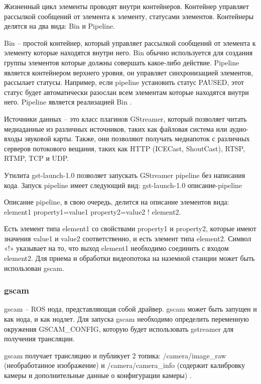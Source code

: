 Жизненный цикл элементы проводят внутри контейнеров. Контейнер управляет рассылкой сообщений от элемента к элементу, статусами элементов. Контейнеры делятся на два вида: Bin и Pipeline.

Bin -- простой контейнер, который управляет рассылкой сообщений от элемента к элементу которые находятся внутри него. Bin обычно используется для создания группы элементов которые должны совершать какое-либо действие. 
Pipeline является контейнером верхнего уровня, он управляет синхронизацией элементов, рассылает статусы. Например, если pipeline установить статус PAUSED, этот статус будет автоматически разослан всем элементам которые находятся внутри него. Pipeline является реализацией Bin \cite{gstreamer}. 

Источники данных -- это класс плагинов GStreamer, который позволяет читать медиаданные из различных источников, таких как файловая система или аудио-входы звуковой карты. Также, они позволяют получать медиапоток с различных серверов потокового вещания, таких как HTTP (ICECast, ShoutCast), RTSP, RTMP, TCP и UDP. 

Утилита gst-launch-1.0 позволяет запускать GStreamer pipeline без написания кода. Запуск pipeline имеет следующий вид:
gst-launch-1.0 описание-pipeline

Описание pipeline, в свою очередь, делится на описание элементов вида:
element1 property1=value1 property2=value2 ! element2.

Есть элемент типа element1 со свойствами property1 и property2, которые имеют значения value1 и value2 соответственно, и есть элемент типа element2. Символ «!» указывает на то, что выход element1 необходимо соединить с входом element2.
Для приема и обработки видеопотока на наземной станции может быть использован gscam.

\subsubsection{gscam}
gscam -- ROS нода, представляющая собой драйвер. gscam может быть запущен и как нода, и как нодлет.
Для запуска gscam необходимо определить переменную окружения GSCAM\_CONFIG, которую будет использовать gstreamer для получения трансляции.

gscam получает трансляцию и публикует 2 топика: /camera/image\_raw (необработанное изображение) и /camera/camera\_info (содержит калибровку камеры и дополнительные данные о конфигурации камеры) \cite{ros}.

